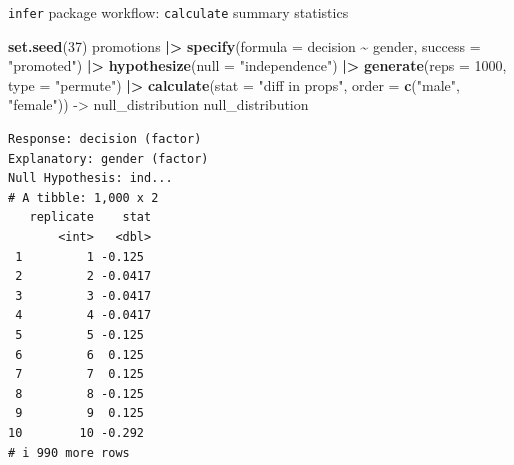 \documentclass[
  ignorenonframetext,
]{beamer}
\newenvironment{Shaded}{\begin{snugshade}}{\end{snugshade}}
\newcommand{\AttributeTok}[1]{\textcolor[rgb]{0.13,0.29,0.53}{#1}}
\newcommand{\DecValTok}[1]{\textcolor[rgb]{0.00,0.00,0.81}{#1}}
\newcommand{\FunctionTok}[1]{\textcolor[rgb]{0.13,0.29,0.53}{\textbf{#1}}}
\newcommand{\NormalTok}[1]{#1}
\newcommand{\OtherTok}[1]{\textcolor[rgb]{0.56,0.35,0.01}{#1}}
\newcommand{\SpecialCharTok}[1]{\textcolor[rgb]{0.81,0.36,0.00}{\textbf{#1}}}
\newcommand{\StringTok}[1]{\textcolor[rgb]{0.31,0.60,0.02}{#1}}
\begin{document}
\begin{frame}[fragile]{\texttt{infer} package workflow:
\texttt{calculate} summary statistics}
\label{infer-package-workflow-calculate-summary-statistics-1}
\tiny

\begin{Shaded}
\begin{Highlighting}[]
\FunctionTok{set.seed}\NormalTok{(}\DecValTok{37}\NormalTok{)}
\NormalTok{promotions }\SpecialCharTok{|\textgreater{}} 
  \FunctionTok{specify}\NormalTok{(}\AttributeTok{formula =}\NormalTok{ decision }\SpecialCharTok{\textasciitilde{}}\NormalTok{ gender, }\AttributeTok{success =} \StringTok{"promoted"}\NormalTok{) }\SpecialCharTok{|\textgreater{}} 
  \FunctionTok{hypothesize}\NormalTok{(}\AttributeTok{null =} \StringTok{"independence"}\NormalTok{) }\SpecialCharTok{|\textgreater{}} 
  \FunctionTok{generate}\NormalTok{(}\AttributeTok{reps =} \DecValTok{1000}\NormalTok{, }\AttributeTok{type =} \StringTok{"permute"}\NormalTok{) }\SpecialCharTok{|\textgreater{}} 
  \FunctionTok{calculate}\NormalTok{(}\AttributeTok{stat =} \StringTok{"diff in props"}\NormalTok{, }\AttributeTok{order =} \FunctionTok{c}\NormalTok{(}\StringTok{"male"}\NormalTok{, }\StringTok{"female"}\NormalTok{)) }\OtherTok{{-}\textgreater{}}\NormalTok{ null\_distribution}
\NormalTok{null\_distribution}
\end{Highlighting}
\end{Shaded}

\begin{verbatim}
Response: decision (factor)
Explanatory: gender (factor)
Null Hypothesis: ind...
# A tibble: 1,000 x 2
   replicate    stat
       <int>   <dbl>
 1         1 -0.125 
 2         2 -0.0417
 3         3 -0.0417
 4         4 -0.0417
 5         5 -0.125 
 6         6  0.125 
 7         7  0.125 
 8         8 -0.125 
 9         9  0.125 
10        10 -0.292 
# i 990 more rows
\end{verbatim}

\normalsize
\end{frame}
\end{document}
